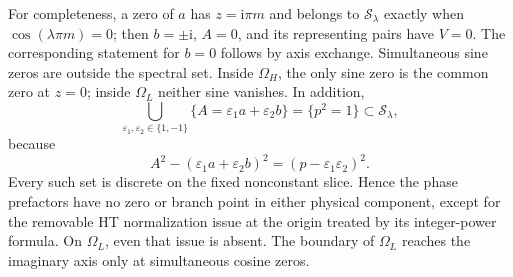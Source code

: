 \documentclass[11pt]{article}
\numberwithin{equation}{section}
\theoremstyle{definition}
\newcommand{\ii}{\mathrm i}
\newcommand{\eps}{\varepsilon}
\newcommand{\cS}{\mathcal S}
\newcommand{\OH}{\Omega_H}
\newcommand{\OL}{\Omega_L}
\begin{document}
For completeness, a zero of \(a\) has \(z=\ii\pi m\) and belongs
to \(\cS_\lambda\) exactly when \(\cos(\lambda\pi m)=0\);
then \(b=\pm\ii\), \(A=0\), and its representing pairs have
\(V=0\). The corresponding statement for \(b=0\) follows by
axis exchange. Simultaneous sine zeros are outside the spectral set.
Inside \(\OH\), the only sine zero is the common zero at \(z=0\);
inside \(\OL\) neither sine vanishes. In addition,
\begin{equation}\label{eq:cornerp}
 \bigcup_{\eps_1,\eps_2\in\{1,-1\}}
 \{A=\eps_1 a+\eps_2b\}=\{p^2=1\}\subset\cS_\lambda,
\end{equation}
because
\[
 A^2-(\eps_1 a+\eps_2 b)^2=(p-\eps_1\eps_2)^2.
\]
Every such set is discrete on the fixed nonconstant slice. Hence
the phase prefactors have no zero or branch point in either physical
component, except for the removable HT normalization issue at the
origin treated by its integer-power formula. On \(\OL\), even that
issue is absent. The boundary of \(\OL\) reaches the imaginary axis
only at simultaneous cosine zeros.
\end{document}
